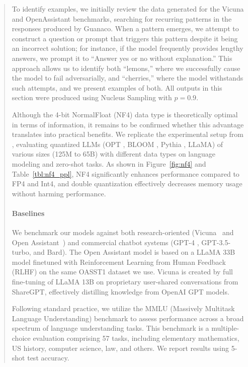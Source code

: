 \begin{quote}
To identify examples, we initially review the data generated for the Vicuna and OpenAssistant benchmarks, searching for recurring patterns in the responses produced by {Guanaco}. When a pattern emerges, we attempt to construct a question or prompt that triggers this pattern despite it being an incorrect solution; for instance, if the model frequently provides lengthy answers, we prompt it to “Answer yes or no without explanation.” This approach allows us to identify both “lemons,” where we successfully cause the model to fail adversarially, and “cherries,” where the model withstands such attempts, and we present examples of both. All outputs in this section were produced using Nucleus Sampling \cite{holtzmancurious} with $p=0.9$.

Although the 4-bit NormalFloat (NF4) data type is theoretically optimal in terms of information, it remains to be confirmed whether this advantage translates into practical benefits. We replicate the experimental setup from \citet{dettmers2022case}, evaluating quantized LLMs (OPT \citep{zhang2022opt}, BLOOM \cite{scao2022bloom}, Pythia \cite{biderman2023pythia}, LLaMA) of various sizes (125M to 65B) with different data types on language modeling and zero-shot tasks. As shown in Figure~\ref{fig:nf4} and Table~\ref{tbl:nf4_ppl}, NF4 significantly enhances performance compared to FP4 and Int4, and double quantization effectively decreases memory usage without harming performance.

\paragraph{Baselines} We benchmark our models against both research-oriented (Vicuna~\citep{vicuna2023} and Open Assistant~\citep{kopf2023openassistant}) and commercial chatbot systems (GPT-4 \citep{openai2023gpt}, GPT-3.5-turbo, and Bard). The Open Assistant model is based on a LLaMA 33B model finetuned with Reinforcement Learning from Human Feedback (RLHF) on the same OASST1 dataset we use. Vicuna is created by full fine-tuning of LLaMA 13B on proprietary user-shared conversations from ShareGPT, effectively distilling knowledge from OpenAI GPT models.

Following standard practice, we utilize the MMLU (Massively Multitask Language Understanding) benchmark \citep{hendrycksmeasuring} to assess performance across a broad spectrum of language understanding tasks. This benchmark is a multiple-choice evaluation comprising 57 tasks, including elementary mathematics, US history, computer science, law, and others. We report results using 5-shot test accuracy.


\end{quote}
